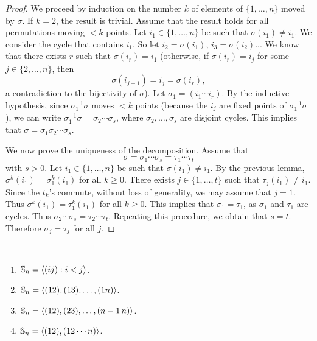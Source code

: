 \begin{proof}
    We proceed by induction on the number $k$ 
    of elements of $\{1,\dots,n\}$ moved by $\sigma$. If $k=2$, 
    the result is trivial. Assume that the result 
    holds for all permutations moving $<k$ points. Let
    $i_1\in\{1,\dots,n\}$ be such that $\sigma(i_1)\ne i_1$. We 
    consider the cycle that contains $i_1$. So let 
        $i_2=\sigma(i_1)$, $i_3=\sigma(i_2)$... We know that 
        there exists $r$ such that $\sigma(i_r)=i_1$
 (otherwise, if $\sigma(i_r)=i_j$ for some 
        $j\in\{2,\dots,n\}$, then 
        \[
        \sigma(i_{j-1})=i_j=\sigma(i_r),
        \]
        a contradiction to the bijectivity of $\sigma$). 
        Let $\sigma_1=(i_1\cdots i_r)$. By the inductive hypothesis, since 
        $\sigma_1^{-1}\sigma$ moves $<k$ points (because 
        the $i_j$ are fixed points of $\sigma_1^{-1}\sigma$), 
        we can write $\sigma_1^{-1}\sigma=\sigma_2\cdots\sigma_s$, where 
        $\sigma_2,\dots,\sigma_s$ are disjoint cycles. 
        This implies that $\sigma=\sigma_1\sigma_2\cdots\sigma_s$.

        We now prove the uniqueness of the decomposition. 
        Assume that 
        \[
        \sigma=\sigma_1\cdots\sigma_s=\tau_1\cdots\tau
_t
\]
with $s>0$. Let $i_1\in\{1,\dots,n\}$ be such that 
        $\sigma(i_1)\ne i_1$. By the previous lemma, $\sigma^k(i_1)=\sigma_1^k(i_1)$ for all $k\geq0$.
        There exists $j\in\{1,\dots,t\}$ such that 
        $\tau_j(i_1)\ne i_1$. Since the $t_k$'s commute, 
        without loss of generality, we may assume that $j=
1$. Thus $\sigma^k(i_1)=\tau_1^k(i_1)$ for all $k\geq0$.  
This implies that 
        $\sigma_1=\tau_1$, as $\sigma_1$ and $\tau_1$ are cycles. 
        Thus $\sigma_2\cdots\sigma_s=\tau_2\cdots\tau_t$. Repeating
        this procedure, we obtain that $s=t$. Therefore 
        $\sigma_j=\tau_j$ for all $j$.
\end{proof}

\begin{corollary}\
\label{cor:generation}
        \begin{enumerate}
                \item $\mathbb{S}_n=\langle (ij):i<j\rangle$.
                \item $\mathbb{S}_n=\langle (12),(13),\dots,(1n)\rangle$.
                \item $\mathbb{S}_n=\langle (12),(23),\dots,(n-1\,n)\rangle$.
                \item $\mathbb{S}_n=\langle (12),(12\cdots n)\rangle$.
        \end{enumerate}
\end{corollary}

